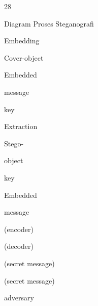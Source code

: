 \documentclass{article}
\begin{document}

28

Diagram Proses Steganografi

Embedding

Cover-object

Embedded 

message

key 

Extraction

Stego-

object

key 

Embedded 

message

(encoder)

(decoder)

(secret message)

(secret message)

adversary
\end{document}
